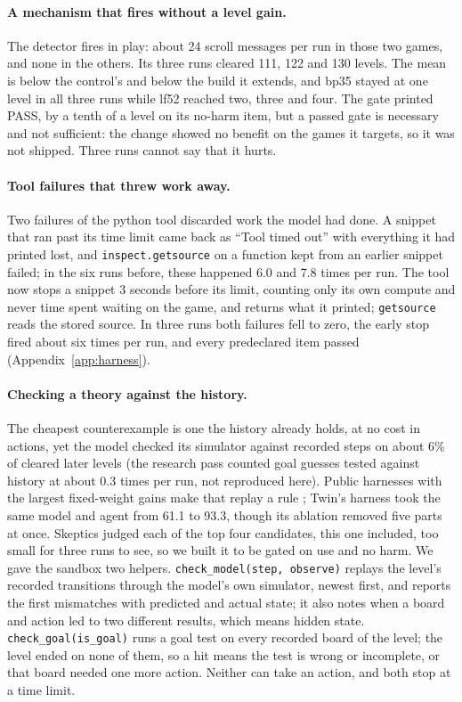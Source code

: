 \paragraph{A mechanism that fires without a level gain.}
The detector fires in play: about 24 scroll messages per run in those two games, and none in the others. %
Its three runs cleared 111, 122 and 130 levels. %
The mean is below the control's and below the build it extends, and bp35 stayed at one level in all three runs while lf52 reached two, three and four. %
The gate printed PASS, by a tenth of a level on its no-harm item, but a passed gate is necessary and not sufficient: the change showed no benefit on the games it targets, so it was not shipped. %
Three runs cannot say that it hurts.

\paragraph{Tool failures that threw work away.}
Two failures of the python tool discarded work the model had done. %
A snippet that ran past its time limit came back as ``Tool timed out'' with everything it had printed lost, and \texttt{inspect.getsource} on a function kept from an earlier snippet failed; in the six runs before, these happened 6.0 and 7.8 times per run. %
The tool now stops a snippet 3 seconds before its limit, counting only its own compute and never time spent waiting on the game, and returns what it printed; \texttt{getsource} reads the stored source. %
In three runs both failures fell to zero, the early stop fired about six times per run, and every predeclared item passed (Appendix~\ref{app:harness}). %

\paragraph{Checking a theory against the history.}
The cheapest counterexample is one the history already holds, at no cost in actions, yet the model checked its simulator against recorded steps on about 6\% of cleared later levels (the research pass counted goal guesses tested against history at about 0.3 times per run, not reproduced here). %
Public harnesses with the largest fixed-weight gains make that replay a rule \citep{skoutnev2026twin,rodionov2026ablation}; Twin's harness took the same model and agent from 61.1 to 93.3, though its ablation removed five parts at once. %
Skeptics judged each of the top four candidates, this one included, too small for three runs to see, so we built it to be gated on use and no harm. %
We gave the sandbox two helpers. %
\texttt{check\_model(step, observe)} replays the level's recorded transitions through the model's own simulator, newest first, and reports the first mismatches with predicted and actual state; it also notes when a board and action led to two different results, which means hidden state. %
\texttt{check\_goal(is\_goal)} runs a goal test on every recorded board of the level; the level ended on none of them, so a hit means the test is wrong or incomplete, or that board needed one more action. %
Neither can take an action, and both stop at a time limit. %

